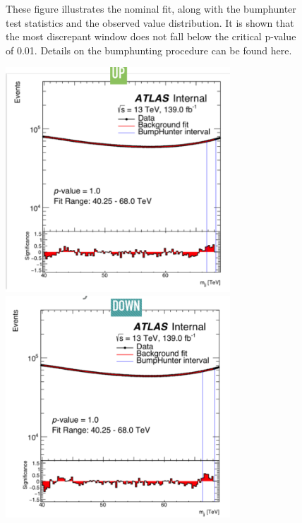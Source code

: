 \begin{figure}[!htb]
\begin{center}
        \caption{
        These figure illustrates the nominal fit, along with the bumphunter test statistics and the observed value distribution. It is shown that the most discrepant window does not fall below the critical p-value of 0.01. Details on the bumphunting procedure can be found here. }
            \label{fig:dimuonstudies}
    \end{center}
\end{figure}


\begin{figure}[!htb]
    \begin{center}
        \includegraphics[width=0.75\textwidth]{figures/chapter_dimuon/UpVariation}
        \includegraphics[width=0.75\textwidth]{figures/chapter_dimuon/DownVariation}

\end{center}
\end{figure}

